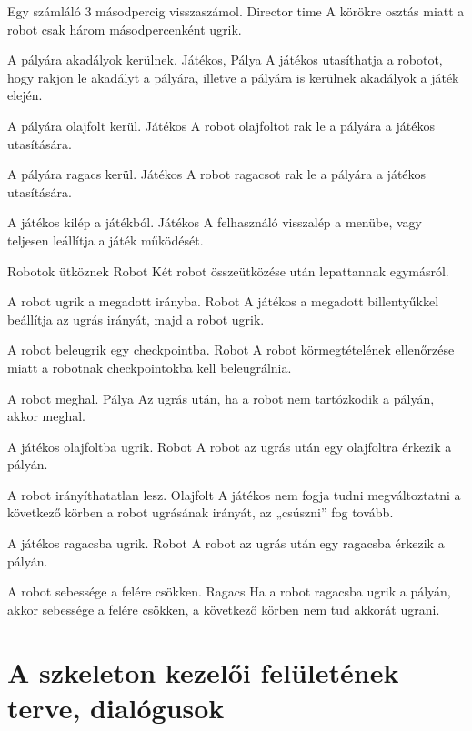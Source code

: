 {Egy számláló 3 másodpercig visszaszámol.}
{Director time}
{A körökre osztás miatt a robot csak három másodpercenként ugrik.}
\pagebreak

{A pályára akadályok kerülnek.}
{Játékos, Pálya}
{A játékos utasíthatja a robotot, hogy rakjon le akadályt a pályára, illetve a pályára is kerülnek akadályok a játék elején.}

{A pályára olajfolt kerül.}
{Játékos}
{A robot olajfoltot rak le a pályára a játékos utasítására.}

{A pályára ragacs kerül.}
{Játékos}
{A robot ragacsot rak le a pályára a játékos utasítására.}

{A játékos kilép a játékból.}
{Játékos}
{A felhasználó visszalép a menübe, vagy teljesen leállítja a játék működését.}

{Robotok ütköznek}
{Robot}
{Két robot összeütközése után lepattannak egymásról.}

{A robot ugrik a megadott irányba.}
{Robot}
{A játékos a megadott billentyűkkel beállítja az ugrás irányát, majd a robot ugrik.}
\newpage

{A robot beleugrik egy checkpointba.}
{Robot}
{A robot körmegtételének ellenőrzése miatt a robotnak checkpointokba kell beleugrálnia.}

{A robot meghal.}
{Pálya}
{Az ugrás után, ha a robot nem tartózkodik a pályán, akkor meghal.}

{A játékos olajfoltba ugrik.}
{Robot}
{A robot az ugrás után egy olajfoltra érkezik a pályán.}

{A robot irányíthatatlan lesz.}
{Olajfolt}
{A játékos nem fogja tudni megváltoztatni a következő körben a robot ugrásának irányát, az „csúszni” fog tovább.}

{A játékos ragacsba ugrik.}
{Robot}
{A robot az ugrás után egy ragacsba érkezik a pályán.}

{A robot sebessége a felére csökken.}
{Ragacs}
{Ha a robot ragacsba ugrik a pályán, akkor sebessége a felére csökken, a következő körben nem tud akkorát ugrani.}
\pagebreak

\section{A szkeleton kezelői felületének terve, dialógusok}

